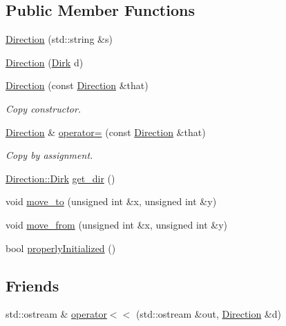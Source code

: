 \subsection*{Public Member Functions}
\begin{DoxyCompactItemize}
\item 
\hyperlink{class_direction_af17924e019c164609181cdf6bca30397}{Direction} (std\-::string \&s)
\item 
\hyperlink{class_direction_a180839d58bb1ff41301425963701d963}{Direction} (\hyperlink{class_direction_a218282b2789da5abcafb2be32cf99011}{Dirk} d)
\item 
\hyperlink{class_direction_a1c24d60ad7382e5091d38e6b191db3d9}{Direction} (const \hyperlink{class_direction}{Direction} \&that)
\begin{DoxyCompactList}\small\item\em Copy constructor. \end{DoxyCompactList}\item 
\hyperlink{class_direction}{Direction} \& \hyperlink{class_direction_a935591bae199779575f6ddc8d8f73ba1}{operator=} (const \hyperlink{class_direction}{Direction} \&that)
\begin{DoxyCompactList}\small\item\em Copy by assignment. \end{DoxyCompactList}\item 
\hyperlink{class_direction_a218282b2789da5abcafb2be32cf99011}{Direction\-::\-Dirk} \hyperlink{class_direction_a8160f7e9bd8442e5a5cc66743c223d1d}{get\-\_\-dir} ()
\item 
void \hyperlink{class_direction_a9ccac2a9f99b9c67cac948bfd99cd366}{move\-\_\-to} (unsigned int \&x, unsigned int \&y)
\item 
void \hyperlink{class_direction_a769ec4b4375d0a78596109005a66eb80}{move\-\_\-from} (unsigned int \&x, unsigned int \&y)
\item 
bool \hyperlink{class_direction_a892f0d3aecac651fe905f3208a486818}{properly\-Initialized} ()
\end{DoxyCompactItemize}
\subsection*{Friends}
\begin{DoxyCompactItemize}
\item 
std\-::ostream \& \hyperlink{class_direction_a81c17e954a272036ec685b1e79b1b006}{operator$<$$<$} (std\-::ostream \&out, \hyperlink{class_direction}{Direction} \&d)
\end{DoxyCompactItemize}



